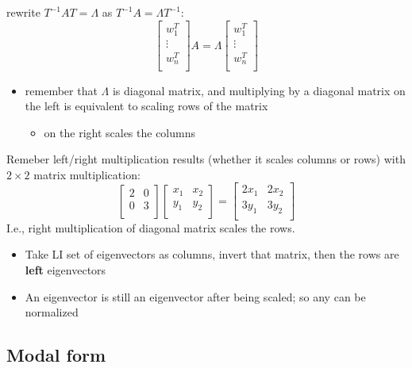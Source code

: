 \documentclass[10pt,letterpaper]{article}
\begin{document}
rewrite $T ^{-1} AT = \Lambda$ as $T ^{-1} A = \Lambda T ^{-1}$:
$$ 
\begin{bmatrix}
  w ^{T} _1 \\
  \vdots    \\
  w ^{T} _n \\
\end{bmatrix}
A=\Lambda
\begin{bmatrix}
  w ^{T} _1 \\
  \vdots    \\
  w ^{T} _n \\
\end{bmatrix}
$$
\begin{itemize}
\item remember that $\Lambda$ is diagonal matrix, and multiplying by a diagonal matrix on the left is equivalent to scaling rows of the matrix

\begin{itemize}
\item on the right scales the columns
\end{itemize}

\end{itemize}
Remeber left/right multiplication results (whether it scales columns or rows) with $2 \times 2$ matrix multiplication:
$$
\begin{bmatrix}
    2 &   0 \\
    0 &   3 \\
\end{bmatrix}
\begin{bmatrix}
  x_1 & x_2 \\
  y_1 & y_2 \\
\end{bmatrix}
=
\begin{bmatrix}
  2x_1 & 2x_2 \\
  3y_1 & 3y_2 \\
\end{bmatrix}
$$
I.e., right multiplication of diagonal matrix scales the rows.
\begin{itemize}
\item Take LI set of eigenvectors as columns, invert that matrix, then the rows are \textbf{left} eigenvectors
\item An eigenvector is still an eigenvector after being scaled; so any can be normalized
\end{itemize}
\subsection{Modal form}
\label{sec-11_6}
\end{document}
